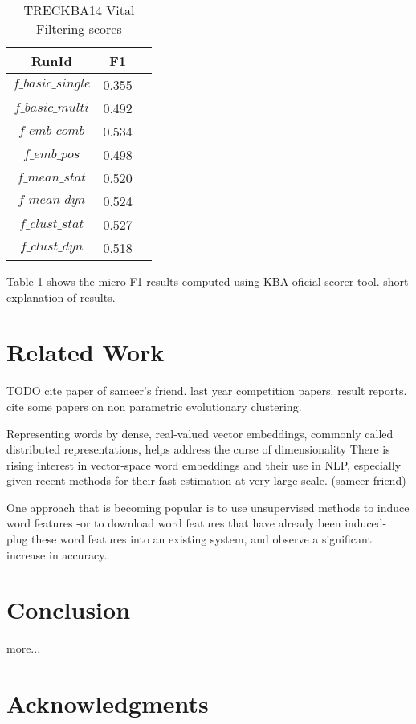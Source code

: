 \documentclass{article}
\begin{document}
\begin{table}[H]
\center
\begin{tabular}{|c|c|c|} \hline
\textbf{RunId} & \textbf{F1} \\ \hline\hline
$f\_basic\_single$ & 0.355 \\ \hline
$f\_basic\_multi$ & 0.492 \\ \hline
$f\_emb\_comb$ & 0.534 \\ \hline
$f\_emb\_pos$ & 0.498 \\ \hline
$f\_mean\_stat$ & 0.520 \\ \hline
$f\_mean\_dyn$ & 0.524 \\ \hline
$f\_clust\_stat$ & 0.527 \\ \hline
$f\_clust\_dyn$ & 0.518 \\ \hline
\end{tabular}
\caption{TRECKBA14 Vital Filtering scores}
\label{f1}
\end{table}

Table \ref{f1} shows the micro F1 results computed using KBA oficial scorer tool.
short explanation of results.

\section{Related Work}
\label{related}

TODO 
cite paper of sameer's friend.
last year competition papers. result reports.
cite some papers on non parametric evolutionary clustering.

Representing words by dense, real-valued vector embeddings, commonly called distributed representations, helps address the curse of dimensionality
There is rising interest in vector-space word embeddings and their use in NLP, especially given recent methods for their fast estimation at very large scale. (sameer friend)

One approach that is becoming popular is to use unsupervised methods to induce word features -or to download word features that have already been induced- plug these word features into an existing system, and observe a significant increase in accuracy.

\section{Conclusion}
\label{conclusion}

more...

\section*{Acknowledgments} 
 


\end{document}
